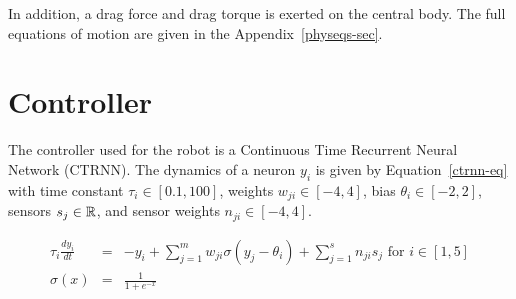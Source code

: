 In addition, a drag force and drag torque is exerted on the central
body.  The full equations of motion are given in the
Appendix~\ref{physeqs-sec}.

\section{Controller}

The controller used for the robot is a Continuous Time Recurrent
Neural Network (CTRNN).  The dynamics of a neuron $y_i$ is given by
Equation~\ref{ctrnn-eq} with time constant $\tau_i \in [0.1, 100]$,
weights $w_{ji} \in [-4, 4]$, bias $\theta_i \in [-2, 2]$, sensors
$s_j \in \mathbb{R} $, and sensor weights $n_{ji} \in [-4, 4]$.

\begin{eqnarray}
  \tau_i \frac{d y_i}{dt} &=& -y_i + \sum_{j = 1}^m w_{ji} \sigma(y_j - \theta_i) + \sum_{j=1}^s n_{ji} s_j \text{ for } i \in [1,5] \label{ctrnn-eq} \\
  \sigma(x) &=& \frac{1}{1 + e^{-x}}
\end{eqnarray}

